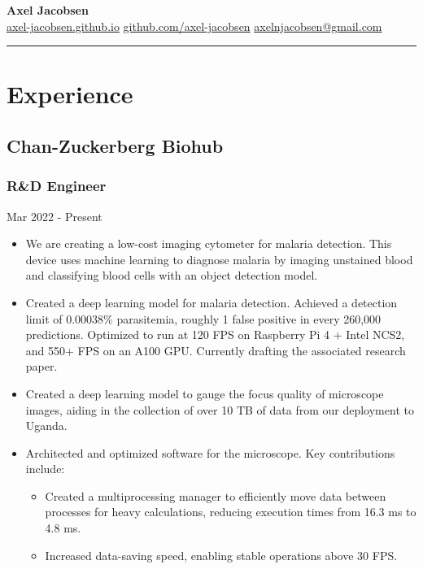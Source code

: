 \documentclass[a4paper, 10pt]{article}
\begin{document}
\newcommand{\educationentry}[3]{
    \begin{tabularx}{\linewidth}{X r}
        \textbf{#1} & \textbf{#2} \\
        #3 & \\
    \end{tabularx}
}

\centering
\textbf{\Large Axel Jacobsen} \\
\href{https://axel-jacobsen.github.io}{axel-jacobsen.github.io} \quad
\href{https://github.com/axel-jacobsen}{github.com/axel-jacobsen} \quad
\href{mailto:axelnjacobsen@gmail.com}{axelnjacobsen@gmail.com} \\
\hrule

\flushleft

\section*{Experience}

\subsection*{Chan-Zuckerberg Biohub}
\subsubsection*{R\&D Engineer}
Mar 2022 - Present
\begin{itemize}
    \item We are creating a low-cost imaging cytometer for malaria detection. This device uses machine learning to diagnose malaria by imaging unstained blood and classifying blood cells with an object detection model.
    \item Created a deep learning model for malaria detection. Achieved a detection limit of 0.00038\% parasitemia, roughly 1 false positive in every 260,000 predictions. Optimized to run at 120 FPS on Raspberry Pi 4 + Intel NCS2, and 550+ FPS on an A100 GPU. Currently drafting the associated research paper.
    \item Created a deep learning model to gauge the focus quality of microscope images, aiding in the collection of over 10 TB of data from our deployment to Uganda.
    \item Architected and optimized software for the microscope. Key contributions include:
    \begin{itemize}
        \item Created a multiprocessing manager to efficiently move data between processes for heavy calculations, reducing execution times from 16.3 ms to 4.8 ms.
        \item Increased data-saving speed, enabling stable operations above 30 FPS.
    \end{itemize}
\end{itemize}
\end{document}
